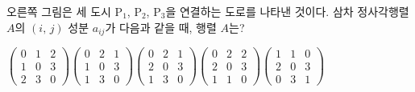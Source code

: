 \noindent\begin{minipage}[t]{0.58\linewidth}\vspace{0pt}\raggedright 오른쪽 그림은 세 도시 $\mathrm{P_1}$, $\mathrm{P_2}$, $\mathrm{P_3}$을 연결하는 도로를 나타낸 것이다. 삼차 정사각행렬 $A$의 $(i,\,j)$ 성분 $a_{ij}$가 다음과 같을 때, 행렬 $A$는?\end{minipage}\hfill\begin{minipage}[t]{0.4\linewidth}\vspace{0pt}\centering \resizebox{\ifdim\width>\linewidth\linewidth\else\width\fi}{!}{}\end{minipage}\par
\noindent {}
\begin{choicesii}{$\begin{pmatrix} 0 & 1 & 2 \\ 1 & 0 & 3 \\ 2 & 3 & 0 \end{pmatrix}$}{$\begin{pmatrix} 0 & 2 & 1 \\ 1 & 0 & 3 \\ 1 & 3 & 0 \end{pmatrix}$}{$\begin{pmatrix} 0 & 2 & 1 \\ 2 & 0 & 3 \\ 1 & 3 & 0 \end{pmatrix}$}{$\begin{pmatrix} 0 & 2 & 2 \\ 2 & 0 & 3 \\ 1 & 1 & 0 \end{pmatrix}$}{$\begin{pmatrix} 1 & 1 & 0 \\ 2 & 0 & 3 \\ 0 & 3 & 1 \end{pmatrix}$}\end{choicesii}
